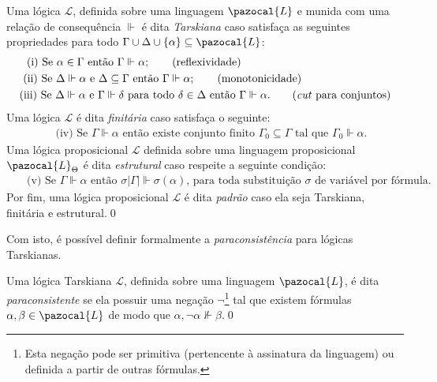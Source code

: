 \begin{definicao}
    \label{def:tarski}
    Uma lógica $\mathcal{L}$, definida sobre uma linguagem $\pazocal{L}$ e munida com uma relação de consequência $\Vdash$ é dita \textit{Tarskiana} caso satisfaça as seguintes propriedades para todo $\Gamma \cup \Delta \cup \{\alpha\} \subseteq \pazocal{L}$:
    \begin{align}
         & \text{~~(i) Se } \alpha \in \Gamma \text{ então } \Gamma \Vdash \alpha;\tag{reflexividade}                                                                                       \\
         & \text{~(ii) Se } \Delta \Vdash \alpha \text{ e } \Delta \subseteq \Gamma \text{ então } \Gamma \Vdash \alpha;\tag{monotonicidade}                                                \\
         & \text{(iii) Se } \Delta \Vdash \alpha \text{ e } \Gamma \Vdash \delta \text{ para todo } \delta \in \Delta \text{ então } \Gamma \Vdash \alpha.\tag{\textit{cut} para conjuntos}
    \end{align}
    Uma lógica $\mathcal{L}$ é dita \textit{finitária} caso satisfaça o seguinte: 
    \begin{align*}
         & \text{~(iv) Se } \Gamma \Vdash \alpha \text{ então existe conjunto finito } \Gamma_{0} \subseteq \Gamma \text{ tal que } \Gamma_{0} \Vdash \alpha.
    \end{align*}
    Uma lógica proposicional $\mathcal{L}$ definida sobre uma linguagem proposicional $\pazocal{L}_{\Theta}$ é dita \textit{estrutural} caso respeite a seguinte condição:
    \begin{align*}
         & \text{~~(v) Se } \Gamma \Vdash \alpha \text{ então } \sigma |\Gamma| \Vdash \sigma(\alpha) \text{, para toda substituição } \sigma \text{ de variável por fórmula.}
    \end{align*}
    Por fim, uma lógica proposicional $\mathcal{L}$ é dita \textit{padrão} caso ela seja Tarskiana, finitária e estrutural.\qed{}
\end{definicao}


Com isto, é possível definir formalmente a \textit{paraconsistência} para lógicas Tarskianas.

\begin{definicao}
    \label{def:tarskiana_paracons}
    Uma lógica Tarskiana $\mathcal{L}$, definida sobre uma linguagem $\pazocal{L}$, é dita \textit{paraconsistente} se ela possuir uma negação $\neg$\footnote{Esta negação pode ser primitiva (pertencente à assinatura da linguagem) ou definida a partir de outras fórmulas.} tal que existem fórmulas $\alpha, \beta \in \pazocal{L}$ de modo que $\alpha, \neg \alpha \nVdash \beta$.\qed{}
\end{definicao}

